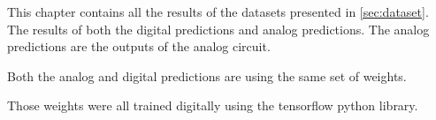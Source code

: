 \label{cap:results}

This chapter contains all the results of the datasets presented in \cref{sec:dataset}. The results of both the digital predictions and analog predictions. The analog predictions are the outputs of the analog circuit.

Both the analog and digital predictions are using the same set of weights.

Those weights were all trained digitally using the tensorflow python library.



\cleardoublepage
